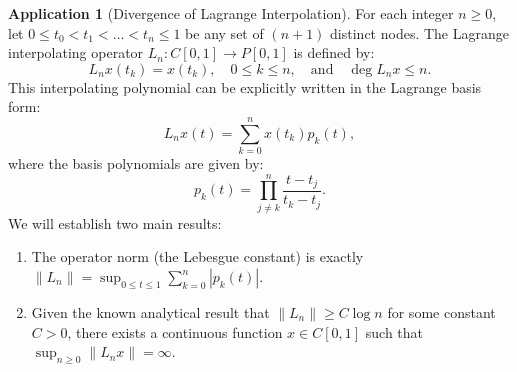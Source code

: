 \documentclass[11pt,a4paper]{article}
\theoremstyle{plain}
\theoremstyle{definition}
\newtheorem{application}{Application}[section]
\begin{document}
\begin{application}[Divergence of Lagrange Interpolation]
    For each integer $n\ge 0$, let $0\le t_{0} < t_{1} < \dots < t_{n}\le 1$ be any set of $(n+1)$ distinct nodes. The Lagrange interpolating operator $L_{n}:C[0,1]\rightarrow P[0,1]$ is defined by:
    \[
        L_{n}x(t_{k})=x(t_{k}), \quad 0\le k\le n, \quad \text{and} \quad \deg L_{n}x \le n.
    \]
    This interpolating polynomial can be explicitly written in the Lagrange basis form:
    \[
        L_{n}x(t) = \sum_{k=0}^{n}x(t_{k})p_{k}(t),
    \]
    where the basis polynomials are given by:
    \[
        p_{k}(t) = \prod_{j\ne k}^{n}\frac{t-t_{j}}{t_{k}-t_{j}}.
    \]
    We will establish two main results:
    \begin{enumerate}
        \item The operator norm (the Lebesgue constant) is exactly $\|L_{n}\| = \sup_{0\le t\le 1}\sum_{k=0}^{n}|p_{k}(t)|$.
        \item Given the known analytical result that $\|L_{n}\| \ge C \log n$ for some constant $C>0$, there exists a continuous function $x\in C[0,1]$ such that $\sup_{n\ge 0}\|L_{n}x\| = \infty$.
    \end{enumerate}
\end{application}
\end{document}
